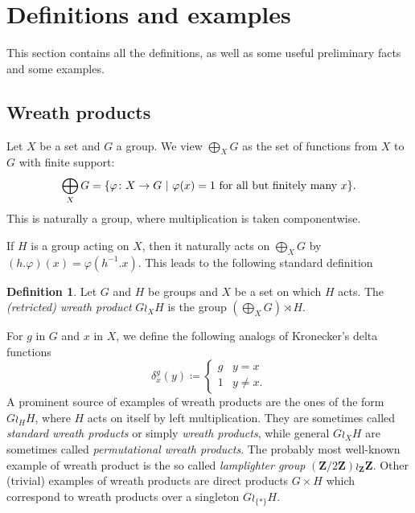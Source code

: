 \documentclass[a4paper]{article}
\theoremstyle{definition}
\newtheorem{defn}[lem]{Definition}
\newcommand*{\field}[1]{\mathbf{#1}}
\newcommand*{\Z}{\field{Z}}
\newcommand{\setst}[2]{\{#1\ |\ #2\}}
\begin{document}
\section{Definitions and examples}\label{Section:Def}
This section contains all the definitions, as well as some useful preliminary facts and some examples.
%
%
%
%
%
%
%
%
%
%
\subsection{Wreath products}
%
%
%
%
%
Let $X$ be a set and $G$ a group. We view
$\bigoplus_XG$ as the set of functions from $X$ to $G$ with finite support:
\[
	\bigoplus_XG=\setst{\varphi\colon X\to G}{\varphi(x)=1 \textnormal{ for all but finitely many }x}.
\]
This is naturally a group, where multiplication is taken componentwise.

If $H$ is a group acting on $X$, then it naturally acts on $\bigoplus_XG$
by $(h.\varphi)(x)=\varphi(h^{-1}.x)$.
This leads to the following standard definition
\begin{defn}\label{Def:WreathProd}
Let $G$ and $H$ be groups and $X$ be a set on which $H$ acts.
The \emph{(retricted) wreath product} $G\wr_XH$ is the group $(\bigoplus_XG)\rtimes H$.
\end{defn}
For $g$ in $G$ and $x$ in $X$, we define the following analogs of Kronecker's delta functions
\begin{equation*}
\delta_x^g (y) \coloneqq
\begin{cases}
g & y = x \\
1 & y \neq x.
\end{cases}
\end{equation*}
A prominent  source of examples of wreath products are the ones of the form $G\wr_HH$, where $H$ acts on itself by left multiplication.
They are sometimes called \emph{standard wreath products} or simply \emph{wreath products}, while general $G\wr_XH$ are sometimes called \emph{permutational wreath products}.
The probably most well-known example of wreath product is the so called \emph{lamplighter group} $(\Z/2\Z)\wr_\Z\Z$.
Other (trivial) examples of wreath products are direct products $G\times H$ which correspond to wreath products over a singleton $G\wr_{\{*\}}H$.
%
%
%
%
%
%
%
%
%
%
\end{document}

